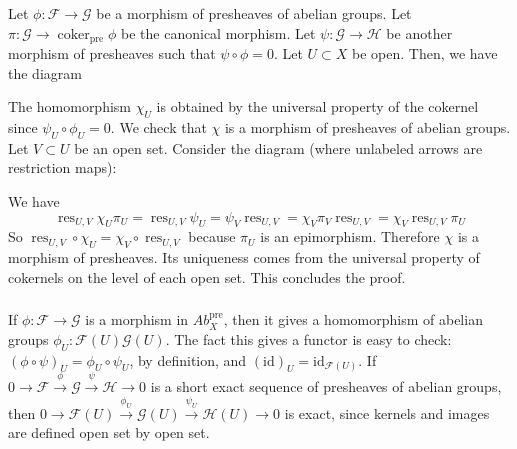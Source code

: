\documentclass{article}
\newcommand{\id}{\mathrm{id}}
\newcommand{\pre}{\mathrm{pre}}
\newcommand{\Ab}{\mathit{Ab}}
\DeclareMathOperator{\coker}{coker}
\DeclareMathOperator{\res}{res}
\newcommand{\Fsheaf}{\mathscr{F}}
\newcommand{\Gsheaf}{\mathscr{G}}
\newcommand{\Hsheaf}{\mathscr{H}}
\newcommand{\exercise}{\subsubsection} %
\begin{document}
\exercise{} Let $\phi : \Fsheaf \to \Gsheaf$ be a morphism of presheaves of abelian groups. Let $\pi : \Gsheaf \to \coker_\pre \phi$ be the canonical morphism. Let $\psi : \Gsheaf \to \Hsheaf$ be another morphism of presheaves such that $\psi \circ \phi = 0$. Let $U \subset X$ be open. Then, we have the diagram
\begin{center}
\end{center}
The homomorphism $\chi_U$ is obtained by the universal property of the cokernel since $\psi_U \circ \phi_U = 0$. We check that $\chi$ is a morphism of presheaves of abelian groups. Let $V \subset U$ be an open set. Consider the diagram (where unlabeled arrows are restriction maps):
\begin{center}
\end{center}
We have
\[\res_{U,V}\chi_U\pi_U = \res_{U,V} \psi_U = \psi_V  \res_{U,V} = \chi_V  \pi_V \res_{U,V} = \chi_V\res_{U,V}\pi_U \]
So $\res_{U,V} \circ \chi_U = \chi_V \circ \res_{U,V}$ because $\pi_U$ is an epimorphism. Therefore $\chi$ is a morphism of presheaves. Its uniqueness comes from the universal property of cokernels on the level of each open set. This concludes the proof.

\exercise{} If $\phi : \Fsheaf \to \Gsheaf$ is a morphism in $\Ab^\pre_X$, then it gives a homomorphism of abelian groups $\phi_U : \Fsheaf(U) \Gsheaf(U)$. The fact this gives a functor is easy to check: $(\phi \circ \psi)_U = \phi_U \circ \psi_U$, by definition, and $(\id)_U = \id_{\Fsheaf(U)}$. If $0 \to \Fsheaf \xrightarrow{\phi} \Gsheaf \xrightarrow{\psi} \Hsheaf \to 0$ is a short exact sequence of presheaves of abelian groups, then $0 \to \Fsheaf(U) \xrightarrow{\phi_U} \Gsheaf(U) \xrightarrow{\psi_U} \Hsheaf(U) \to 0$ is exact, since kernels and images are defined open set by open set.
\end{document}
